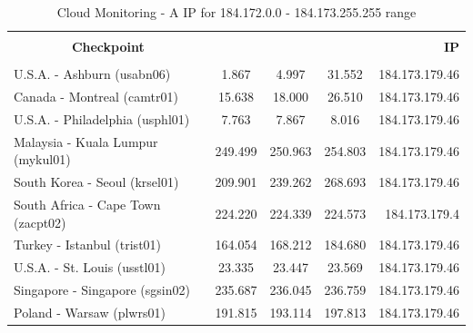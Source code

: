 \documentclass[a4paper,11pt]{book}
\begin{document}
\begin{table}
\label{table:Monitoring_3}
\begin{tabular}{|l|c|c|c|r|}
\hline
\multicolumn{1}{|c|}{\textbf{}} & {\textbf{}} & {\textbf{}} & {\textbf{}} & {\textbf{}}\\
\multicolumn{1}{|c|}{\textbf{Checkpoint}} & {\textbf{RTT minimo} & {\textbf{RTT medio} & {\textbf{RTT massimo} & {\textbf{IP}}\\
\multicolumn{1}{|c|}{\textbf{}} & {\textbf{}} & {\textbf{}} & {\textbf{}} & {\textbf{}}\\
\hline
U.S.A. - Ashburn (usabn06) & 1.867 & 4.997 & 31.552 & 184.173.179.46\\
Canada - Montreal (camtr01) & 15.638 & 18.000 & 26.510 & 184.173.179.46\\
U.S.A. - Philadelphia (usphl01) & 7.763 & 7.867 & 8.016 & 184.173.179.46\\
Malaysia - Kuala Lumpur (mykul01) & 249.499 & 250.963 & 254.803 & 184.173.179.46\\
South Korea - Seoul (krsel01) & 209.901 & 239.262 & 268.693 & 184.173.179.46\\
South Africa - Cape Town (zacpt02) & 224.220 & 224.339 & 224.573 & 184.173.179.4\\
Turkey - Istanbul (trist01) & 164.054 & 168.212 & 184.680 & 184.173.179.46\\
U.S.A. - St. Louis (usstl01) & 23.335 & 23.447 & 23.569 & 184.173.179.46\\
Singapore - Singapore (sgsin02) & 235.687 & 236.045 & 236.759 & 184.173.179.46\\
Poland - Warsaw (plwrs01) & 191.815 & 193.114 & 197.813 & 184.173.179.46\\
\hline
\end{tabular}
\caption{Cloud Monitoring - A IP for 184.172.0.0 - 184.173.255.255 range}
\end{table}

~
\end{document}
